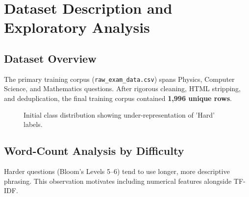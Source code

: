 \documentclass[12pt,a4paper]{article}
\begin{document}
\section{Dataset Description and Exploratory Analysis}

\subsection{Dataset Overview}

The primary training corpus (\texttt{raw\_exam\_data.csv}) spans Physics, Computer Science,
and Mathematics questions. After rigorous cleaning, HTML stripping, and deduplication, the 
final training corpus contained \textbf{1,996 unique rows}.

\begin{figure}[H]
\centering
{}
\caption{Initial class distribution showing under-representation of 'Hard' labels.}
\label{fig:classdist}
\end{figure}

\subsection{Word-Count Analysis by Difficulty}

Harder questions (Bloom's Levels 5--6) tend to use longer, more descriptive phrasing.
This observation motivates including numerical features alongside TF-IDF.
\end{document}

